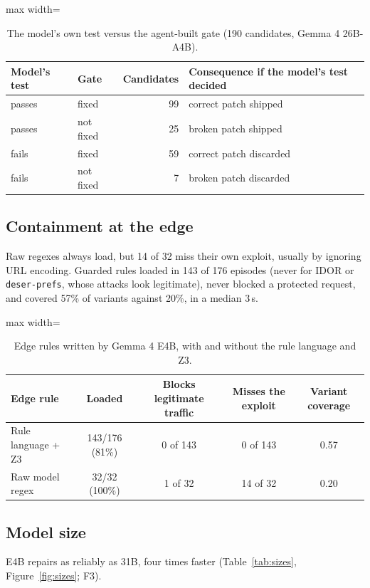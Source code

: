 \documentclass[journal]{IEEEtran}
\newcommand{\code}[1]{\texttt{#1}}
\begin{document}
\begin{table}[!t]
\centering\small
\caption{The model's own test versus the agent-built gate (190 candidates, Gemma 4 26B-A4B).}
\label{tab:selftest}
\begin{adjustbox}{max width=\linewidth}\begin{tabular}{llrl}
\toprule
Model's test & Gate & Candidates & Consequence if the model's test decided\\
\midrule
passes & fixed & 99 & correct patch shipped\\
passes & not fixed & 25 & broken patch shipped\\
fails & fixed & 59 & correct patch discarded\\
fails & not fixed & 7 & broken patch discarded\\
\bottomrule
\end{tabular}\end{adjustbox}
\end{table}

\subsection{Containment at the edge}
Raw regexes always load, but 14 of 32 miss their own exploit, usually by ignoring URL encoding. Guarded rules loaded in 143 of 176 episodes (never for IDOR or \code{deser-prefs}, whose attacks look legitimate), never blocked a protected request, and covered 57\% of variants against 20\%, in a median 3\,s.

\begin{table}[!t]
\centering\small
\caption{Edge rules written by Gemma 4 E4B, with and without the rule language and Z3.}
\label{tab:edge}
\begin{adjustbox}{max width=\linewidth}\begin{tabular}{lcccc}
\toprule
Edge rule & Loaded & Blocks legitimate traffic & Misses the exploit & Variant coverage\\
\midrule
Rule language + Z3 & 143/176 (81\%) & 0 of 143 & 0 of 143 & 0.57\\
Raw model regex & 32/32 (100\%) & 1 of 32 & 14 of 32 & 0.20\\
\bottomrule
\end{tabular}\end{adjustbox}
\end{table}

\subsection{Model size}
E4B repairs as reliably as 31B, four times faster (Table~\ref{tab:sizes}, Figure~\ref{fig:sizes}; F3).
\end{document}
